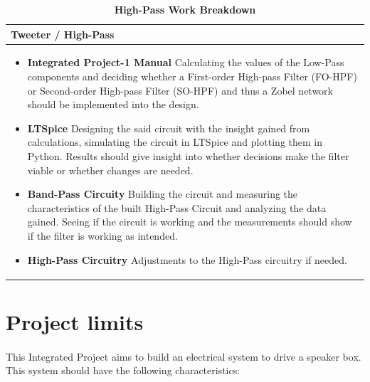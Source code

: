 \begin{table}[h!]
\captionsetup{justification=centering, labelfont=bf}
\caption{\textbf{High-Pass Work Breakdown}}
\begin{tabular*}{\textwidth}{@{\extracolsep{\fill}} p{} @{}} 
\toprule
     \textbf{Tweeter / High-Pass} \\
     \midrule
    \begin{itemize}
        \item \textbf{Integrated Project-1 Manual} \newline Calculating the values of the Low-Pass components and deciding whether a First-order High-pass Filter (FO-HPF) or Second-order High-pass Filter (SO-HPF) and thus a Zobel network should be implemented into the design.
        \item \textbf{LTSpice} \newline Designing the said circuit with the insight gained from calculations, simulating the circuit in LTSpice and plotting them in Python. Results should give insight into whether decisions make the filter viable or whether changes are needed.
        \item \textbf{Band-Pass Circuity} \newline Building the circuit and measuring the characteristics of the built High-Pass Circuit and analyzing the data gained. Seeing if the circuit is working and the measurements should show if the filter is working as intended.
        \item \textbf{High-Pass Circuitry} \newline Adjustments to the High-Pass circuitry if needed.
    \end{itemize} \\
     \bottomrule
\end{tabular*}

\label{tab:HP Work Breakdown}
\end{table}

\section{Project limits}
\paragraph{}
This Integrated Project aims to build an electrical system to drive a speaker box. This system should have the following characteristics:

